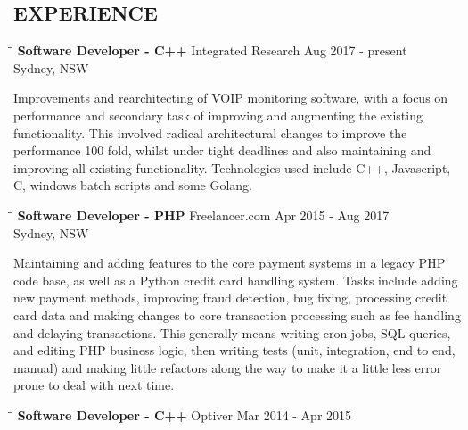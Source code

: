 \documentclass{res}
\begin{document}
\begin{resume}
\section{EXPERIENCE}
   \vspace{-0.1in}	
   \begin{tabbing}
   \hspace{2.3in}\= \hspace{2.6in}\= \kill %
    {\bf Software Developer - C++} \>Integrated Research \>Aug 2017 - present\\
                                   \>Sydney, NSW
   \end{tabbing}\vspace{-20pt}      %
    Improvements and rearchitecting of VOIP monitoring software, with a focus on performance and
    secondary task of improving and augmenting the existing functionality. This involved radical
    architectural changes to improve the performance 100 fold, whilst under tight deadlines and
    also maintaining and improving all existing functionality. Technologies used include C++,
    Javascript, C, windows batch scripts and some Golang.
   \begin{tabbing}
   \hspace{2.3in}\= \hspace{2.6in}\= \kill %
    {\bf Software Developer - PHP} \>Freelancer.com \>Apr 2015 - Aug 2017\\
                                   \>Sydney, NSW
   \end{tabbing}\vspace{-20pt}      %
    Maintaining and adding features to the core payment systems in a legacy
    PHP code base, as well as a Python credit card handling system. Tasks
    include adding new payment methods, improving fraud detection, bug fixing,
    processing credit card data and making changes to core transaction
    processing such as fee handling and delaying transactions. This generally
    means writing cron jobs, SQL queries, and editing PHP business logic, then
    writing tests (unit, integration, end to end, manual) and making little
    refactors along the way to make it a little less error prone to deal with
    next time.
   \begin{tabbing}
   \hspace{2.3in}\= \hspace{2.6in}\= \kill %
    {\bf Software Developer - C++} \>Optiver \>Mar 2014 - Apr 2015\\

\end{tabbing}
\end{resume}
\end{document}
